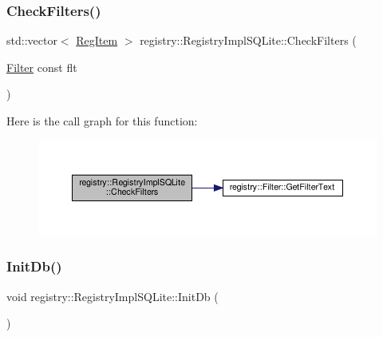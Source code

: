 \mbox{\label{classregistry_1_1RegistryImplSQLite_a75eb46a6b3fb0f1abd01e409d989462d}} 
\subsubsection{\texorpdfstring{Check\+Filters()}{CheckFilters()}\hspace{0.1cm}{\footnotesize\ttfamily [2/2]}}
{\footnotesize\ttfamily std\+::vector$<$ \hyperlink{classregistry_1_1RegItem}{Reg\+Item} $>$ registry\+::\+Registry\+Impl\+S\+Q\+Lite\+::\+Check\+Filters (\begin{DoxyParamCaption}\item[{\hyperlink{classregistry_1_1Filter}{Filter} const}]{flt }\end{DoxyParamCaption})\hspace{0.3cm}{\ttfamily [private]}}

Here is the call graph for this function\+:
\nopagebreak
\begin{figure}[H]
\begin{center}
\leavevmode
\includegraphics[width=350pt]{classregistry_1_1RegistryImplSQLite_a75eb46a6b3fb0f1abd01e409d989462d_cgraph}
\end{center}
\end{figure}
\mbox{\label{classregistry_1_1RegistryImplSQLite_a4a9f3255a1af40969b914e3bc5707874}} 
\subsubsection{\texorpdfstring{Init\+Db()}{InitDb()}}
{\footnotesize\ttfamily void registry\+::\+Registry\+Impl\+S\+Q\+Lite\+::\+Init\+Db (\begin{DoxyParamCaption}{ }\end{DoxyParamCaption})\hspace{0.3cm}{\ttfamily [private]}}

